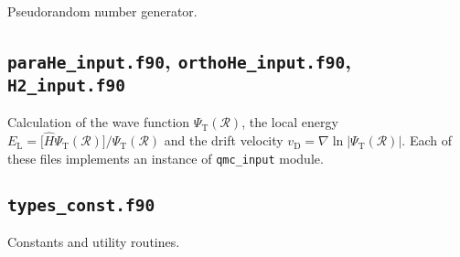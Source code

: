 \documentclass[12pt,a4paper]{article}
\def\code#1{{\lstinline$#1$}}
\begin{document}
Pseudorandom number generator.

\subsection{\code{paraHe_input.f90}, \code{orthoHe_input.f90},
  \code{H2_input.f90}}
\label{sec:qmc_input}

Calculation of the wave function $\Psi_\text{T}(\mathcal R)$, the local
energy $E_\text{L}=\bigl[\hat H \Psi_\text{T}(\mathcal
R)\bigr]/\Psi_\text{T}(\mathcal R)$ and the drift velocity
$v_\text{D}=\nabla\ln |\Psi_\text{T}(\mathcal R)|$. Each of these
files implements an instance of \code{qmc_input} module.

\subsection{\code{types_const.f90}}

Constants and utility routines.




\end{document}
